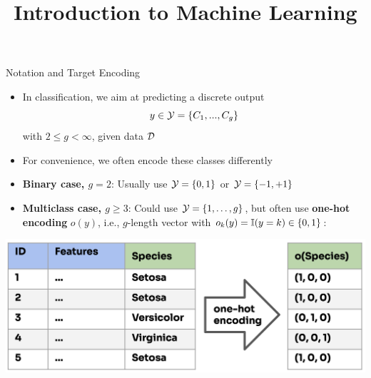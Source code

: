 \documentclass[11pt,compress,t,notes=noshow, xcolor=table]{beamer}
\title{Introduction to Machine Learning}
\begin{document}


\begin{vbframe}{Notation and Target Encoding}

\begin{itemize}
\item In classification, we aim at predicting a discrete output 
$$
y \in \mathcal{Y} = \{C_1, ..., C_g\}
$$
with $2 \le g < \infty$, given data $\mathcal{D}$ 

\item For convenience, we often encode these classes differently

\item \textbf{Binary case, $g = 2$}: Usually use $\mathcal{Y} = \{0, 1\}$ or $\mathcal{Y} = \{-1, +1\}$

\item \textbf{Multiclass case, $g \ge 3$}: Could use $\mathcal{Y} = \{1, \ldots, g\}$, but often use \textbf{one-hot encoding} $o(y)$, i.e., $g$-length vector with $o_k(y) = \mathbb{I}(y = k) \in \{0,1\}$:

\end{itemize}

\begin{center}
  \includegraphics[width=0.65\linewidth]{figure_man/one-hot_encoding.png} 
\end{center}

\end{vbframe}
\end{document}
